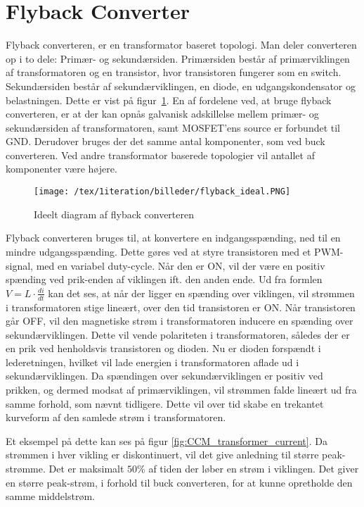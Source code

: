\section{Flyback Converter}
Flyback converteren, er en transformator baseret topologi. Man deler converteren op i to dele: Primær- og sekundærsiden. Primærsiden består af primærviklingen af transformatoren og en transistor, hvor transistoren fungerer som en switch. Sekundærsiden består af sekundærviklingen, en diode, en udgangskondensator og belastningen. Dette er vist på figur~\ref{fig:flyback_ideal}. En af fordelene ved, at bruge flyback converteren, er at der kan opnås galvanisk adskillelse mellem primær- og sekundærsiden af transformatoren, samt MOSFET'ens source er forbundet til GND. Derudover bruges der det samme antal komponenter, som ved buck converteren. Ved andre transformator baserede topologier vil antallet af komponenter være højere. 

\begin{figure}[H]
	\center
	\texttt{[image: /tex/1iteration/billeder/flyback\_ideal.PNG]}
	\caption{Ideelt diagram af flyback converteren
	\cite{SMPS-topologies}}
	\label{fig:flyback_ideal}
\end{figure} 

\noindent Flyback converteren bruges til, at konvertere en indgangsspænding, ned til en mindre udgangsspænding. Dette gøres ved at styre transistoren med et PWM-signal, med en variabel duty-cycle. Når den er ON, vil der være en positiv spænding ved prik-enden af viklingen ift. den anden ende. Ud fra formlen $V=L\cdot \frac{di}{dt}$ kan det ses, at når der ligger en spænding over viklingen, vil strømmen i transformatoren stige lineært, over den tid transistoren er ON. Når transistoren går OFF, vil den magnetiske strøm i transformatoren inducere en spænding over sekundærviklingen. Dette vil vende polariteten i transformatoren, således der er en prik ved henholdsvis transistoren og dioden. Nu er dioden forspændt i lederetningen, hvilket vil lade energien i transformatoren aflade ud i sekundærviklingen. Da spændingen over sekundærviklingen er positiv ved prikken, og dermed modsat af primærviklingen, vil strømmen falde lineært ud fra samme forhold, som nævnt tidligere. Dette vil over tid skabe en trekantet kurveform af den samlede strøm i transformatoren. 

Et eksempel på dette kan ses på figur \ref{fig:CCM_transformer_current}. Da strømmen i hver vikling er diskontinuert, vil det give anledning til større peak-strømme. Det er maksimalt $50\percent$ af tiden der løber en strøm i viklingen. Det giver en større peak-strøm, i forhold til buck converteren, for at kunne opretholde den samme middelstrøm.

